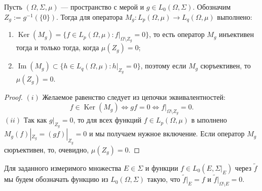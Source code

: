 \begin{proposition}\label{MultpOpSurjInjDesc} Пусть $(\Omega,\Sigma,\mu)$ ---
пространство с мерой и $g\in L_0(\Omega,\Sigma)$. Обозначим 
$Z_g:=g^{-1}( \{0 \})$. Тогда для оператора 
$M_g:L_p(\Omega,\mu)\to L_q(\Omega,\mu)$ выполнено:

\begin{enumerate}[label = (\roman*)]
    \item $\operatorname{Ker}(M_g)= \{
        f\in L_p(\Omega,\mu):f|_{\Omega\setminus {Z_g}}=0 
    \}$, то есть оператор $M_g$ инъективен тогда и только тогда, когда
    $\mu(Z_g)=0$;

    \item $\operatorname{Im}(M_g)\subset \{h\in L_q(\Omega,\mu): h|_{Z_g}=0 \}$,
    поэтому если $M_g$ сюръективен, то $\mu(Z_g)=0$.
\end{enumerate}
\end{proposition}
\begin{proof}
$(i)$ Желаемое равенство следует из цепочки эквивалентностей:
$$
f\in\operatorname{Ker}(M_g)
\Longleftrightarrow g f=0
\Longleftrightarrow f|_{\Omega\setminus Z_g}=0.
$$
$(ii)$ Так как $g|_{Z_g}=0$, то для всех функций $f\in L_p(\Omega,\mu)$ в
ыполнено $M_g(f)|_{Z_g}=(g f)|_{Z_g}=0$ и мы получаем нужное включение. 
Если оператор $M_g$ сюръективен, то, очевидно, $\mu(Z_g)=0$.
\end{proof} 

Для заданного измеримого множества $E\in\Sigma$ и функции $f\in
L_0(E,\Sigma|_{E})$ через $\widetilde{f}$ мы будем обозначать функцию из
$L_0(\Omega, \Sigma)$ такую, что $\widetilde{f}|_E=f$ и
$\widetilde{f}|_{\Omega\setminus E}=0$.

